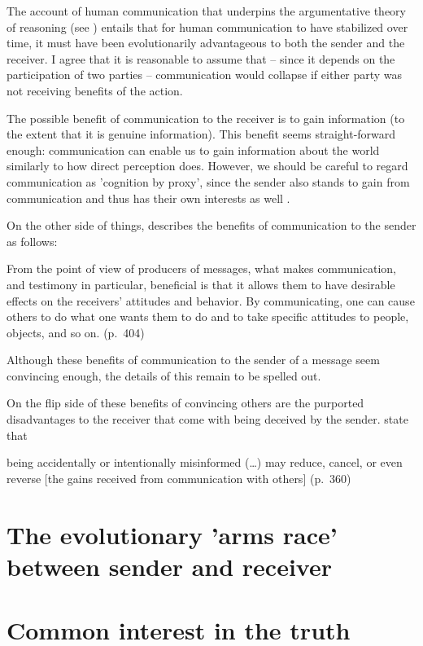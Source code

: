 The account of human communication that underpins the argumentative theory of reasoning (see \citet{Sperber01, Sperber10})
entails that for human communication to have stabilized over time, it must have been evolutionarily advantageous to both the sender and the receiver. I agree that it is reasonable to assume that -- since it depends on the participation of two parties -- communication would collapse if either party was not receiving benefits of the action.

The possible benefit of communication to the receiver is to gain information (to the extent that it is genuine information).
This benefit seems straight-forward enough: communication can enable us to gain information about the world similarly to how direct perception does. However, we should be careful to regard communication as 'cognition by proxy', since the sender also stands to gain from communication and thus has their own interests as well \citep{Sperber01}.

On the other side of things, \citet{Sperber01} describes the benefits of communication to the sender as follows:
\begin{quoting}
    From the point of view of producers of messages, what makes communication, and testimony in particular, beneficial is that it allows them to have desirable effects on the receivers' attitudes and behavior. By communicating, one can cause others to do what one wants them to do and to take specific attitudes to people, objects, and so on.
    \hfill (p.~404)
\end{quoting}
Although these benefits of communication to the sender of a message seem convincing enough, the details of this remain to be spelled out.

On the flip side of these benefits of convincing others are the purported disadvantages to the receiver that come with being deceived by the sender. \citet{Sperber10} state that
\begin{quoting}
    being accidentally or intentionally misinformed (\ldots) may reduce, cancel, or even reverse [the gains received from communication with others]
    \hfill (p.~360)
\end{quoting}

\section{The evolutionary 'arms race' between sender and receiver}

\section{Common interest in the truth}
